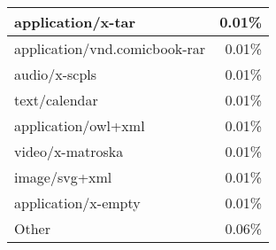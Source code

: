 \begin{center}
\begin{supertabular}[H]{l|r}
	\hline
	application/x-tar	&	0.01\% \\
	\hline
	application/vnd.comicbook-rar	&	0.01\% \\
	\hline
	audio/x-scpls		&	0.01\% \\
	\hline
	text/calendar		&	0.01\% \\
	\hline
	application/owl+xml	&	0.01\% \\
	\hline
	video/x-matroska	&	0.01\% \\
	\hline
	image/svg+xml		&	0.01\% \\
	\hline
	application/x-empty	&	0.01\% \\
	\hline
	Other				&	0.06\% \\
	\hline
\end{supertabular}
\end{center}
\fi

\newpage
%
%
